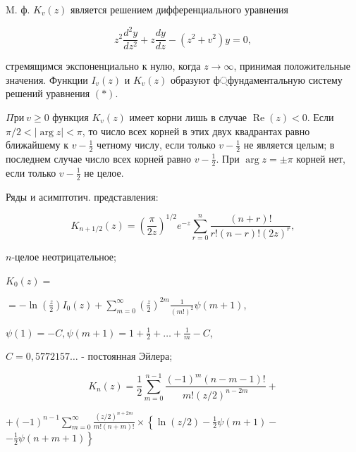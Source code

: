 \documentclass[10pt]{article}
\begin{document}
M. ф. $K_{v}(z)$ является решением дифференциального уравнения



\[

z^{2} \frac{d^{2} y}{d z^{2}}+z \frac{d y}{d z}-\left(z^{2}+v^{2}\right) y=0,

\]



стремящимся экспоненциально к нулю, когда $z \rightarrow \infty$, принимая положительные значения. Функции $I_{v}(z)$ и $K_{v}(z)$ образуют ф্фундаментальную систему решений уравнения $(*)$.



$\Pi р и ~ v \geqslant 0$ функция $K_{v}(z)$ имеет корни лишь в случае $\operatorname{Re}(z)<0$. Если $\pi / 2<|\arg z|<\pi$, то число всех корней в этих двух квадрантах равно ближайшему к $v-\frac{1}{2}$ четному числу, если только $v-\frac{1}{2}$ не является целым; в последнем случае число всех корней равно $v-\frac{1}{2}$. При $\arg z= \pm \pi$ корней нет, если только $v-\frac{1}{2}$ не целое.



Ряды и асимптотич. представления:



\[

K_{n+1 / 2}(z)=\left(\frac{\pi}{2 z}\right)^{1 / 2} e^{-z} \sum_{r=0}^{n} \frac{(n+r) !}{r !(n-r) !(2 z)^{r}},

\]



$n$-целое неотрицательное;



$K_{0}(z)=$



$=-\ln \left(\frac{z}{2}\right) I_{0}(z)+\sum_{m=0}^{\infty}\left(\frac{z}{2}\right)^{2 m} \frac{1}{(m !)^{2}} \psi(m+1)$,



$\psi(1)=-C, \psi(m+1)=1+\frac{1}{2}+\ldots+\frac{1}{m}-C$,



$C=0,5772157 \ldots$ - постоянная Эйлера;



\[

K_{n}(z)=\frac{1}{2} \sum_{m=0}^{n-1} \frac{(-1)^{m}(n-m-1) !}{m !(z / 2)^{n-2 m}}+

\]



$+(-1)^{n-1} \sum_{m=0}^{\infty} \frac{(z / 2)^{n+2 m}}{m !(n+m) !} \times\left\{\ln (z / 2)-\frac{1}{2} \psi(m+1)-\right.$ $\left.-\frac{1}{2} \psi(n+m+1)\right\}$
\end{document}
